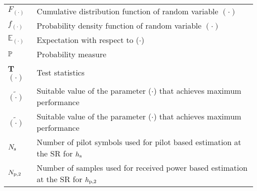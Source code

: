 \begin{longtable}{p{}p{}}
       $F_{(\cdot)}$           &       Cumulative distribution function of random variable $(\cdot)$ \\
       $f_{(\cdot)}$           &       Probability density function of random variable $(\cdot)$ \\
       $\mathbb E_{(\cdot)}$   &       Expectation with respect to ($\cdot$) \\
       $\mathbb P$                    &       Probability measure \\
       \textbf{T}$(\cdot)$     &       Test statistics \\
       $\tilde{(\cdot)}$       &       Suitable value of the parameter ($\cdot$) that achieves maximum performance \\
       $\tilde{(\cdot)}$       &       Suitable value of the parameter ($\cdot$) that achieves maximum performance \\
       $N_{\text{s}}$                   &       Number of pilot symbols used for pilot based estimation at the SR for $h_{\text{s}}$ \\
       $N_{\text{p,2}}$                   &       Number of samples used for received power based estimation at the SR for $h_{\text{p,2}}$ \\
\end{longtable}
  




